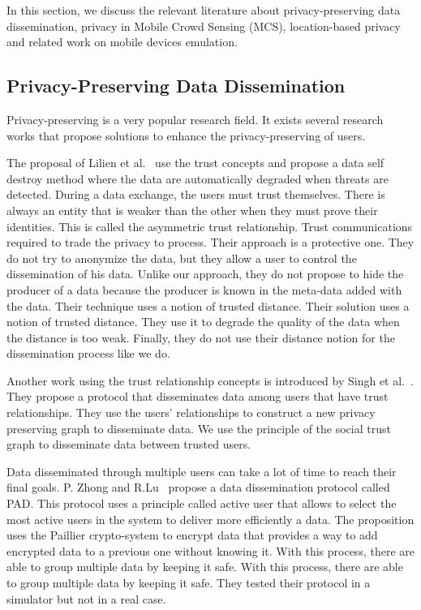 

In this section, we discuss the relevant literature about privacy-preserving data dissemination, privacy in Mobile Crowd Sensing (MCS), location-based privacy and related work on mobile devices emulation.

\subsection{Privacy-Preserving Data Dissemination}

Privacy-preserving is a very popular research field.
It exists several research works that propose solutions to enhance the privacy-preserving of users.

The proposal of Lilien et al.~\cite{DBLP:journals/tsmc/LilienB06} use the trust concepts and propose a data self destroy method where the data are automatically degraded when threats are detected.
During a data exchange, the users must trust themselves.
There is always an entity that is weaker than the other when they must prove their identities.
This is called the asymmetric trust relationship.
Trust communications required to trade the privacy to process.
Their approach is a protective one.
They do not try to anonymize the data, but they allow a user to control the dissemination of his data.
Unlike our approach, they do not propose to hide the producer of a data because the producer is known in the meta-data added with the data.
Their technique uses a notion of trusted distance.
Their solution uses a notion of trusted distance.
They use it to degrade the quality of the data when the distance is too weak.
Finally, they do not use their distance notion for the dissemination process like we do.

Another work using the trust relationship concepts is introduced by Singh et al.~\cite{DBLP:conf/icdcs/SinghUSV12}.
They propose a protocol that disseminates data among users that have trust relationships.
They use the users' relationships to construct a new privacy preserving graph to disseminate data. 
We use the principle of the social trust graph to disseminate data between trusted users.

Data disseminated through multiple users can take a lot of time to reach their final goals.
P. Zhong and R.Lu~\cite{DBLP:conf/iccoms/ZhongL14} propose a data dissemination protocol called PAD.
This protocol uses a principle called active user that allows to select the most active users in the system to deliver more efficiently a data.
The proposition uses the Paillier crypto-system to encrypt data that provides a way to add encrypted data to a previous one without knowing it. 
With this process, there are able to group multiple data by keeping it safe.
With this process, there are able to group multiple data by keeping it safe.
They tested their protocol in a simulator but not in a real case.


